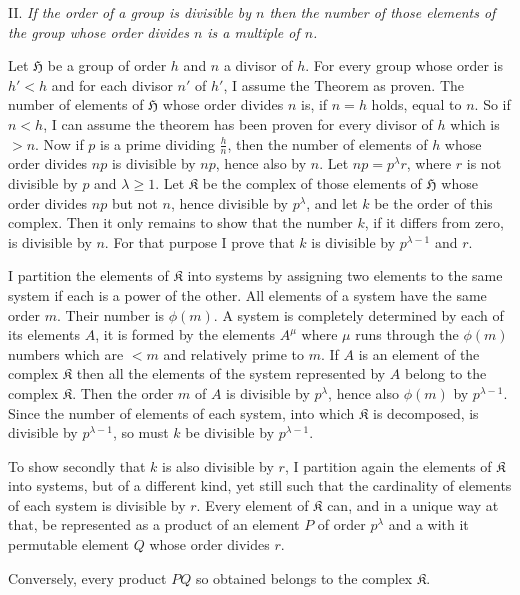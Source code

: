 \documentclass[a5paper,12pt]{article}
\let\fr\mathfrak
\newcommand{\CH}{\fr{H}}
\newcommand{\CK}{\fr{K}}
\newcommand{\?}{{\color{blue}${}^{(?)}$}}
\newcounter{origpagecounter}{}
\newcommand{\origpagebreak}{\mark{\arabic{origpagecounter}}\addtocounter{origpagecounter}{1}\mark{\arabic{origpagecounter}}}
\begin{document}

II.
%
\label{t:2-2}
%
\emph{ %
If the order of a group is divisible by $n$
then the number of those elements of the group
whose order divides $n$
is a multiple of $n$.
}


Let $\CH$ be a group of order $h$ 
and 
$n$ a divisor of $h$.
%
%
For every group whose order is $h' < h$
and
for each divisor $n'$ of $h'$,
I assume the Theorem as proven.
%
%
The number of elements of $\CH$
whose order divides $n$
is,
if $n = h$ holds,
equal to $n$.
%
%
So if $n < h$,
I can assume
the theorem has been proven
for every divisor of $h$
which is $> n$.
%
%
Now if $p$ is a prime
dividing
$\frac{h}{n}$,
then
the number of elements of $h$
whose order divides $n p$
is divisible by $n p$,
hence also by $n$.
%
%
Let $n p = p^\lambda r$,
where $r$ is not divisible by $p$ and $\lambda \geq 1$.
%
%
Let $\CK$
be the complex
of those elements of $\CH$
whose order divides $n p$
but not $n$,
hence divisible by $p^\lambda$,
and let $k$ be the order of this complex.
%
%
Then it only remains to show
that the number $k$,
if it differs from zero,
is divisible by $n$.
%
%
For that purpose I prove
that $k$ is divisible
by $p^{\lambda-1}$ and $r$.


I partition the elements of $\CK$
into systems
by
assigning two elements
to the same system
if each is a power of the other.
%
%
All elements of a system
have the same order $m$.
%
%
Their number is $\phi(m)$.
%
%
A system is completely determined
by each of its elements $A$,
it is formed by the elements $A^\mu$
where $\mu$ runs through the $\phi(m)$ numbers
which are $< m$ and relatively prime to $m$.
%
%
If $A$ is an element of the complex $\CK$
then all the elements
of the system represented by $A$
belong to the complex $\CK$.
%
%
Then the order $m$ of $A$
is divisible by $p^\lambda$,
hence also $\phi(m)$ by $p^{\lambda-1}$.
%
%
Since the number of elements
of each system,
into which $\CK$ is decomposed,
is divisible by $p^{\lambda-1}$,
so
must $k$ be divisible by $p^{\lambda-1}$.


To show secondly
that
$k$ is also divisible by $r$,
I partition again
the elements of $\CK$ into systems,
but of a different kind,
yet still such that
the cardinality of elements
of each system is divisible by $r$.
%
%
Every element of $\CK$ can,
and in a unique way at that,
be represented 
as a product 
of an element $P$ of order $p^\lambda$
and
a with it permutable element $Q$ 
whose order divides $r$.
%
%
\origpagebreak
%
%
Conversely,
every product $P Q$
so obtained
belongs 
to the complex $\CK$.
\end{document}

